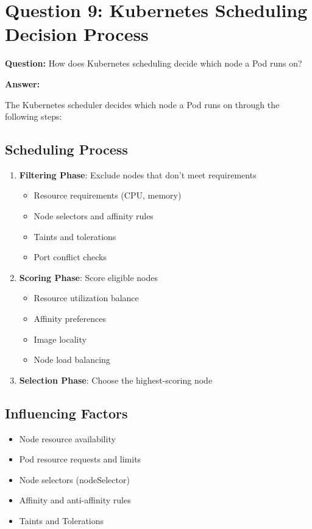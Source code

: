 \documentclass[12pt,a4paper]{article}
\begin{document}
\section{Question 9: Kubernetes Scheduling Decision Process}

\textbf{Question:} How does Kubernetes scheduling decide which node a Pod runs on?

\textbf{Answer:}

The Kubernetes scheduler decides which node a Pod runs on through the following steps:

\subsection{Scheduling Process}
\begin{enumerate}
    \item \textbf{Filtering Phase}: Exclude nodes that don't meet requirements
    \begin{itemize}
        \item Resource requirements (CPU, memory)
        \item Node selectors and affinity rules
        \item Taints and tolerations
        \item Port conflict checks
    \end{itemize}
    
    \item \textbf{Scoring Phase}: Score eligible nodes
    \begin{itemize}
        \item Resource utilization balance
        \item Affinity preferences
        \item Image locality
        \item Node load balancing
    \end{itemize}
    
    \item \textbf{Selection Phase}: Choose the highest-scoring node
\end{enumerate}

\subsection{Influencing Factors}
\begin{itemize}
    \item Node resource availability
    \item Pod resource requests and limits
    \item Node selectors (nodeSelector)
    \item Affinity and anti-affinity rules
    \item Taints and Tolerations
\end{itemize}
\end{document}
